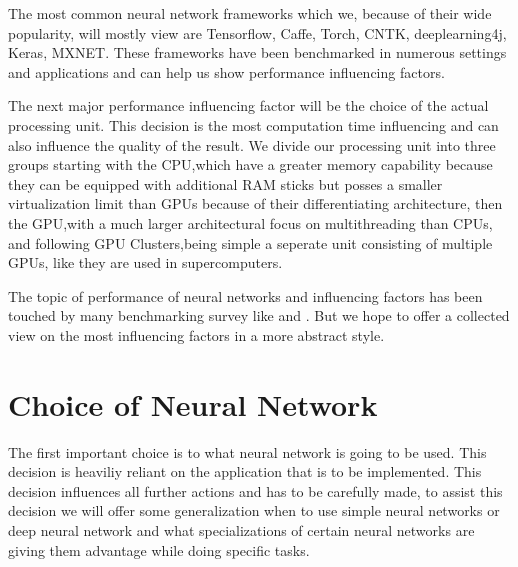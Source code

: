 \documentclass[conference]{IEEEtran}
\begin{document}

The most common neural network frameworks which we, because of their wide popularity, will mostly view are Tensorflow\cite{abadi2016tensorflow}, Caffe\cite{jia2014caffe}, Torch\cite{collobert2002torch}, CNTK\cite{gitcntk}, deeplearning4j\cite{websitedl4j}, Keras\cite{websitekeras}, MXNET\cite{websitemxnet}. These frameworks have been benchmarked in numerous settings and applications and can help us show performance influencing factors.



The next major performance influencing factor will be the choice of the actual processing unit. This decision is the most computation time influencing and can also influence the quality of the result. We divide our processing unit into three groups starting with the CPU,which have a greater memory capability because they can be equipped with additional RAM sticks but posses a smaller virtualization limit than GPUs because of their differentiating architecture, then the GPU,with a much larger architectural focus on multithreading than CPUs, and following GPU Clusters,being simple a seperate unit consisting of multiple GPUs, like they are used in supercomputers.




The topic of performance of neural networks and influencing factors has been touched by many benchmarking survey like \cite{shi2016benchmarking} and \cite{qi2016paleo}.	 But we hope to offer a collected view on the most influencing factors in a more abstract style.




\section{Choice of Neural Network}	

The first important choice is to what neural network is going to be used. This decision is heaviliy reliant on the application that is to be implemented. This decision influences all further actions and has to be carefully made, to assist this decision we will offer some generalization when to use simple neural networks or deep neural network and what specializations of certain neural networks are giving them advantage while doing specific tasks.
\end{document}
